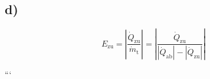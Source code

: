 

\subsection*{d)}
\[
E_{\text{zu}} = \left| \frac{\dot{Q}_{\text{zu}}}{\dot{m}_{\text{t}}} \right| = \left| \frac{\dot{Q}_{\text{zu}}}{\left| \dot{Q}_{\text{ab}} \right| - \left| \dot{Q}_{\text{zu}} \right|} \right|
\]

```